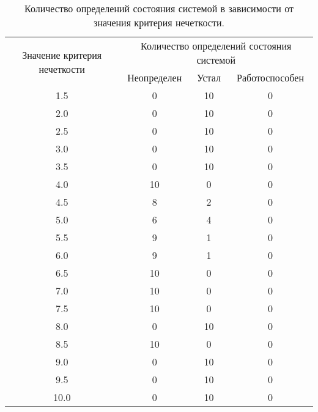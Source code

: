 \begin{table}[H]
	\begin{center}
		\caption{\label{table:time3} Количество определений состояния системой в зависимости от значения критерия нечеткости.}
\begin{tabular}{|c|ccc|}
\hline
\multirow{2}{*}{Значение критерия нечеткости} & \multicolumn{3}{c|}{Количество определений состояния системой}\\ \cline{2-4} & \multicolumn{1}{c|}{Неопределен} & \multicolumn{1}{c|}{Устал} & Работоспособен \\ \hline
1.5& \multicolumn{1}{c|}{0}            & \multicolumn{1}{c|}{10}    &0 \\ \hline
2.0& \multicolumn{1}{c|}{0}            & \multicolumn{1}{c|}{10}      &0 \\ \hline
2.5& \multicolumn{1}{c|}{0}            & \multicolumn{1}{c|}{10}      &0 \\ \hline
3.0& \multicolumn{1}{c|}{0}            & \multicolumn{1}{c|}{10}      &0 \\ \hline
3.5& \multicolumn{1}{c|}{0}            & \multicolumn{1}{c|}{10}      &0 \\ \hline
4.0& \multicolumn{1}{c|}{10}            & \multicolumn{1}{c|}{0}      &0 \\ \hline
4.5& \multicolumn{1}{c|}{8}            & \multicolumn{1}{c|}{2}      &0 \\ \hline
5.0& \multicolumn{1}{c|}{6}            & \multicolumn{1}{c|}{4}      &0 \\ \hline
5.5& \multicolumn{1}{c|}{9}            & \multicolumn{1}{c|}{1}      &0 \\ \hline
6.0& \multicolumn{1}{c|}{9}            & \multicolumn{1}{c|}{1}      &0 \\ \hline
6.5& \multicolumn{1}{c|}{10}            & \multicolumn{1}{c|}{0}      &0 \\ \hline
7.0& \multicolumn{1}{c|}{10}            & \multicolumn{1}{c|}{0}      &0 \\ \hline
7.5& \multicolumn{1}{c|}{10}            & \multicolumn{1}{c|}{0}      &0 \\ \hline
8.0& \multicolumn{1}{c|}{0}            & \multicolumn{1}{c|}{10}      &0 \\ \hline
8.5& \multicolumn{1}{c|}{10}            & \multicolumn{1}{c|}{0}      &0 \\ \hline
9.0& \multicolumn{1}{c|}{0}            & \multicolumn{1}{c|}{10}      &0 \\ \hline
9.5& \multicolumn{1}{c|}{0}            & \multicolumn{1}{c|}{10}      &0 \\ \hline
10.0& \multicolumn{1}{c|}{0}            & \multicolumn{1}{c|}{10}     &0 \\ \hline
\end{tabular}
	\end{center}
\end{table}

